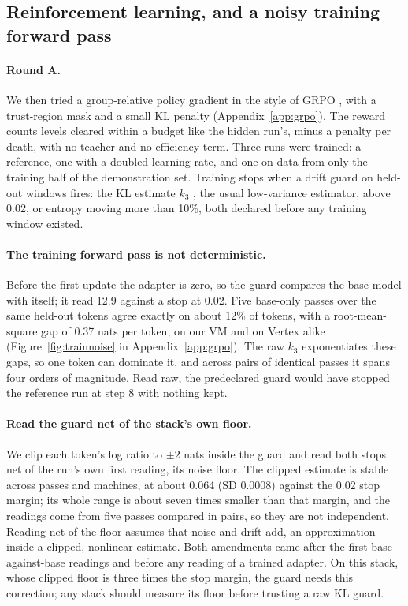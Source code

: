 \subsection{Reinforcement learning, and a noisy training forward pass}\label{sec:rl}

\paragraph{Round A.}
We then tried a group-relative policy gradient in the style of GRPO \citep{shao2024deepseekmath}, with a trust-region mask and a small KL penalty (Appendix~\ref{app:grpo}). %
The reward counts levels cleared within a budget like the hidden run's, minus a penalty per death, with no teacher and no efficiency term. %
Three runs were trained: a reference, one with a doubled learning rate, and one on data from only the training half of the demonstration set. %
Training stops when a drift guard on held-out windows fires: the KL estimate $k_3$ \citep{schulman2020klapprox}, the usual low-variance estimator, above 0.02, or entropy moving more than 10\%, both declared before any training window existed. %

\paragraph{The training forward pass is not deterministic.}
Before the first update the adapter is zero, so the guard compares the base model with itself; it read 12.9 against a stop at 0.02. %
Five base-only passes over the same held-out tokens agree exactly on about 12\% of tokens, with a root-mean-square gap of 0.37 nats per token, on our VM and on Vertex alike (Figure~\ref{fig:trainnoise} in Appendix~\ref{app:grpo}). %
The raw $k_3$ exponentiates these gaps, so one token can dominate it, and across pairs of identical passes it spans four orders of magnitude. %
Read raw, the predeclared guard would have stopped the reference run at step 8 with nothing kept. %

\paragraph{Read the guard net of the stack's own floor.}
We clip each token's log ratio to $\pm2$ nats inside the guard and read both stops net of the run's own first reading, its noise floor. %
The clipped estimate is stable across passes and machines, at about 0.064 (SD 0.0008) against the 0.02 stop margin; its whole range is about seven times smaller than that margin, and the readings come from five passes compared in pairs, so they are not independent. %
Reading net of the floor assumes that noise and drift add, an approximation inside a clipped, nonlinear estimate.
Both amendments came after the first base-against-base readings and before any reading of a trained adapter. %
On this stack, whose clipped floor is three times the stop margin, the guard needs this correction; any stack should measure its floor before trusting a raw KL guard.

